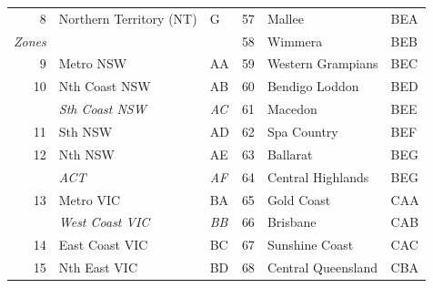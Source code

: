 \documentclass[a4paper,11pt]{article}
\theoremstyle{definition}
\begin{document}
\begin{table}[H]
\begin{tabular}{r l l|r l l}
		8                                    & Northern Territory (NT) & G              & 57                                              & Mallee                          & BEA            \\
		\cline{1-3}
		\multicolumn{1}{l}{\textit{Zones}}   &                         &                & 58                                              & Wimmera                         & BEB            \\
		9                                    & Metro NSW               & AA             & 59                                              & Western Grampians               & BEC            \\
		10                                   & Nth Coast NSW           & AB             & 60                                              & Bendigo Loddon                  & BED            \\
		                                     & \textit{Sth Coast NSW}  & \textit{AC}    & 61                                              & Macedon                         & BEE            \\
		11                                   & Sth NSW                 & AD             & 62                                              & Spa Country                     & BEF            \\
		12                                   & Nth NSW                 & AE             & 63                                              & Ballarat                        & BEG            \\
		                                     & \textit{ACT}            & \textit{AF}    & 64                                              & Central Highlands               & BEG            \\
		13                                   & Metro VIC               & BA             & 65                                              & Gold Coast                      & CAA            \\
		                                     & \textit{West Coast VIC} & \textit{BB}    & 66                                              & Brisbane                        & CAB            \\
		14                                   & East Coast VIC          & BC             & 67                                              & Sunshine Coast                  & CAC            \\
		15                                   & Nth East VIC            & BD             & 68                                              & Central Queensland              & CBA            \\

\end{tabular}
\end{table}
\end{document}
